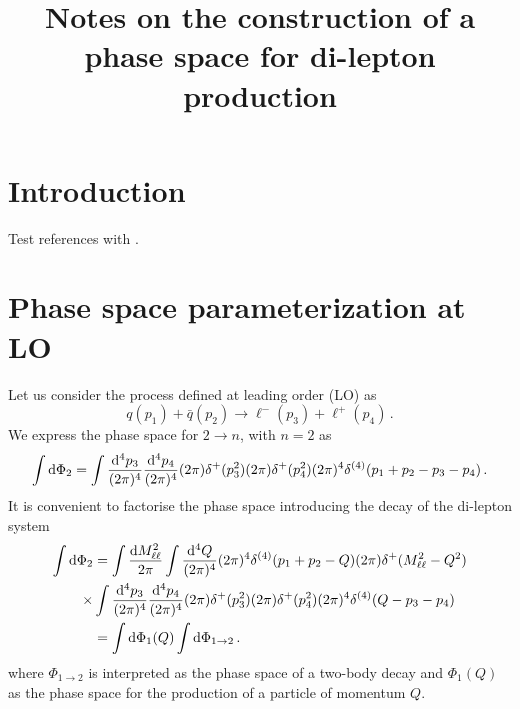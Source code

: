 \documentclass[a4paper,11pt]{article}
\title{Notes on the construction of a phase space for di-lepton production}
\begin{document}
\maketitle

\flushbottom
\section{Introduction}

Test references with \cite{Caola:2017dug}.

\section{Phase space parameterization at LO}
\label{se:LOparam}
Let us consider the process defined at leading order (LO) as
\begin{equation}
q(p_1) + \bar{q}(p_2) \to \ell^-(p_3) + \ell^+(p_4)\, .
\end{equation}
We express the phase space for $2\to n$, with $n=2$ as
\begin{equation}
\int \mathrm d\Phi_2 = 
\int \frac{\mathrm d^4 p_3}{(2\pi)^4} \frac{\mathrm d^4 p_4}{(2\pi)^4} 
(2\pi) \delta^{+}(p^2_3) (2\pi)\delta^{+}(p^2_4) (2\pi)^4\delta^{(4)}(p_1 + p_2 - p_3 - p_4)\,.
\end{equation}
It is convenient to factorise the phase space introducing the decay of the di-lepton system
\begin{align}
\int \mathrm d\Phi_2 & = 
\int \frac{\mathrm d M^2_{\ell\ell}}{2\pi}
\int\frac{\mathrm d^4 Q}{(2\pi)^4} (2\pi)^4\delta^{(4)}(p_1 + p_2 -Q) (2\pi)\delta^+(M^2_{\ell\ell}-Q^2) \nonumber \\
\times & \int \frac{\mathrm d^4 p_3}{(2\pi)^4} \frac{\mathrm d^4 p_4}{(2\pi)^4} 
(2\pi) \delta^{+}(p^2_3) (2\pi)\delta^{+}(p^2_4) (2\pi)^4\delta^{(4)}(Q - p_3 - p_4)\, \nonumber \\
& = \int \mathrm d \Phi_1(Q) \int \mathrm d \Phi_{1\to2}\, .
\end{align}
where $\Phi_{1\to2}$ is interpreted as the phase space of a two-body decay and
$\Phi_1(Q)$ as the phase space for the production of a particle of momentum $Q$.
\end{document}

